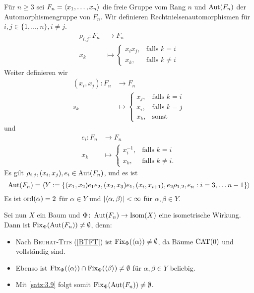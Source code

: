 \begin{beispiel}
\label{bsp:3.10}
	Für $n \geq 3$ sei $F_n = \langle x_1, \dots, x_n\rangle$ die freie Gruppe vom Rang $n$ und $\operatorname{Aut}(F_n)$ der Automorphismengruppe von $F_n$.
	Wir definieren Rechtnielsenautomorphismen für $i,j \in \{1, \dots, n\}, i \neq j$.
	\begin{align*}
		\rho_{i,j} \colon F_n &\longrightarrow F_n \\
		x_k &\longmapsto \begin{cases}
			x_ix_j, & \text{falls } k=i \\
			x_k, & \text{falls } k \neq i
		\end{cases}
	\end{align*}
	Weiter definieren wir
	\begin{align*}
		(x_i,x_j)\colon F_n &\longrightarrow F_n \\
			s_k &\longmapsto \begin{cases}
				x_j, & \text{falls } k=i \\
				x_i, & \text{falls } k=j \\
				x_k, & \text{sonst}
			\end{cases}
	\end{align*}
	und
	\begin{align*}
		e_i \colon F_n &\longrightarrow F_n \\
		x_k &\longmapsto \begin{cases}
			x_i^{-1}, & \text{falls } k = i \\
			x_k, &\text{falls } k \neq i.
		\end{cases}
	\end{align*}
	Es gilt $\rho_{i,j}, (x_i,x_j), e_i \in \operatorname{Aut}(F_n)$, und es ist
	\[
		\operatorname{Aut}(F_n) = \langle Y := \{ (x_1,x_2)e_1e_2, (x_2,x_3)e_1, (x_i,x_{i+1}), e_2\rho_{1,2},e_n : i = 3, \dots n-1\}\rangle
	\]
	Es ist $\operatorname{ord}(\alpha) = 2$ für $\alpha \in Y$ und $\lvert\langle\alpha,\beta\rangle\rvert < \infty$ für $\alpha,\beta \in Y$.
	
	Sei nun $X$ ein Baum und $\Phi\colon \operatorname{Aut}(F_n) \rightarrow \operatorname{Isom}(X)$ eine isometrische Wirkung.
	Dann ist $\operatorname{Fix}_\Phi(\operatorname{Aut}(F_n)) \neq \emptyset$, denn:
	\begin{itemize}
		\item Nach \textsc{Bruhat-Tits} (\autoref{BTFT}) ist $\operatorname{Fix}_\Phi(\langle\alpha\rangle) \neq \emptyset$, da Bäume $\operatorname{CAT(0)}$ und vollständig sind.
		\item Ebenso ist $\operatorname{Fix}_\Phi(\langle\alpha\rangle) \cap \operatorname{Fix}_\Phi(\langle\beta\rangle) \neq \emptyset$ für $\alpha, \beta \in Y$ beliebig.
		\item Mit \autoref{satz:3.9} folgt somit $\operatorname{Fix}_\Phi(\operatorname{Aut}(F_n)) \neq \emptyset$.
	\end{itemize}
\end{beispiel}

